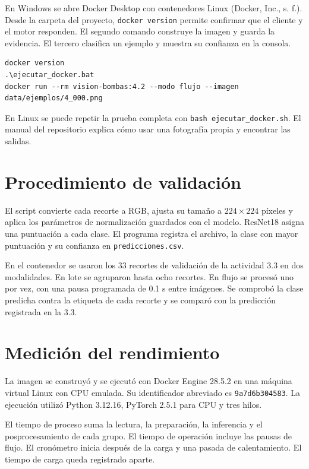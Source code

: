 \documentclass[11pt,letterpaper]{article}
\begin{document}
En Windows se abre Docker Desktop con contenedores Linux (Docker, Inc., s. f.). Desde la carpeta del proyecto, \texttt{docker version} permite confirmar que el cliente y el motor responden. El segundo comando construye la imagen y guarda la evidencia. El tercero clasifica un ejemplo y muestra su confianza en la consola.

{\small
\begin{verbatim}
docker version
.\ejecutar_docker.bat
docker run --rm vision-bombas:4.2 --modo flujo --imagen data/ejemplos/4_000.png
\end{verbatim}
}

En Linux se puede repetir la prueba completa con \texttt{bash ejecutar\_docker.sh}. El manual del repositorio explica cómo usar una fotografía propia y encontrar las salidas.

\clearpage
\section*{Procedimiento de validación}

El script convierte cada recorte a RGB, ajusta su tamaño a \(224 \times 224\) píxeles y aplica los parámetros de normalización guardados con el modelo. ResNet18 asigna una puntuación a cada clase. El programa registra el archivo, la clase con mayor puntuación y su confianza en \texttt{predicciones.csv}.

En el contenedor se usaron los 33 recortes de validación de la actividad 3.3 en dos modalidades. En lote se agruparon hasta ocho recortes. En flujo se procesó uno por vez, con una pausa programada de 0.1 s entre imágenes. Se comprobó la clase predicha contra la etiqueta de cada recorte y se comparó con la predicción registrada en la 3.3.

\section*{Medición del rendimiento}

La imagen se construyó y se ejecutó con Docker Engine 28.5.2 en una máquina virtual Linux con CPU emulada. Su identificador abreviado es \texttt{9a7d6b304583}. La ejecución utilizó Python 3.12.16, PyTorch 2.5.1 para CPU y tres hilos.

El tiempo de proceso suma la lectura, la preparación, la inferencia y el posprocesamiento de cada grupo. El tiempo de operación incluye las pausas de flujo. El cronómetro inicia después de la carga y una pasada de calentamiento. El tiempo de carga queda registrado aparte.
\end{document}
